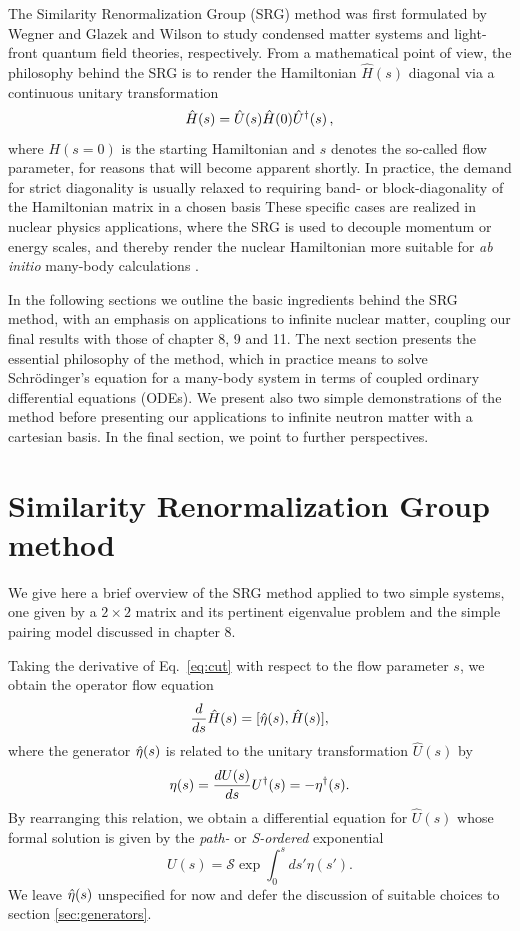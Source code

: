 The Similarity Renormalization Group (SRG) method was first formulated by
Wegner \cite{wegner1994} and Glazek and Wilson \cite{glazek1993}
to study condensed matter systems and light-front quantum field
theories, respectively.  From a mathematical point of view, the
philosophy behind the SRG is to render the Hamiltonian $\hat{H}(s)$
diagonal via a continuous unitary transformation
\begin{equation}\label{eq:cut}
  \hat{H}(s)=\hat{U}(s)\hat{H}(0)\UUO(s)\,,
\end{equation}
where $H(s=0)$ is the starting Hamiltonian and $s$ denotes the so-called flow
parameter, for reasons that will become apparent shortly. In practice, the demand 
for strict diagonality is usually relaxed to requiring band- or block-diagonality 
of the Hamiltonian matrix in a chosen basis
These specific cases are realized in nuclear
physics applications, where the SRG is used to decouple momentum or
energy scales, and thereby render the nuclear Hamiltonian more
suitable for \emph{ab initio} many-body calculations \cite{bogner2007,bogner2010,morris2015,bogner2016}.

In the following sections we outline the basic ingredients behind the
SRG method, with an emphasis on applications to infinite nuclear
matter, coupling our final results with those of chapter 8, 9 and
11. The next section presents the essential philosophy of the method,
which in practice means to solve Schr\"odinger's equation for a
many-body system in terms of coupled ordinary differential equations
(ODEs). We present also two simple demonstrations of the method before
presenting our applications to infinite neutron matter with a
cartesian basis. In the final section, we point to further
perspectives.

\section{Similarity Renormalization Group method}

We give here a brief overview of the SRG method applied to two simple systems, one given by a $2\times 2$ matrix and its pertinent eigenvalue problem and the simple pairing model discussed in chapter 8. 

Taking the derivative of Eq.~\eqref{eq:cut}
with respect to the flow parameter $s$, we obtain the operator flow equation
\begin{equation}\label{eq:opflow}
  \totd{}{s}\hat{H}(s) = \comm{\etaO(s)}{\hat{H}(s)},
\end{equation} 
where the generator $\hat{\eta}(s)$ is related to the unitary transformation $\hat{U}(s)$ by
\begin{equation}
  \eta(s)= \frac{d {U(s)}} {d {s}} U^{\dag}(s) = -\eta^{\dag}(s).
\end{equation}
By rearranging this relation, we obtain a differential equation for $\hat{U}(s)$ whose formal solution is given by the \emph{path-}
or \emph{S-ordered} exponential
\begin{equation}
  U(s) = \mathcal{S}\exp \int^s_0 ds' \eta(s').
\end{equation}
We leave $\hat{\eta}(s)$ unspecified for now and defer the discussion of suitable choices to section \ref{sec:generators}. 

